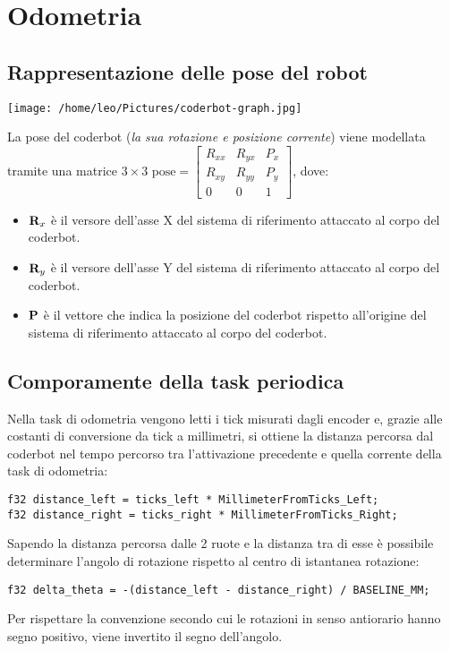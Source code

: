 \documentclass[11pt]{article}
\begin{document}
\section{Odometria}
\label{sec:orge318f63}
\subsection{Rappresentazione delle pose del robot}
\label{sec:orga4cc6c3}
\begin{center}
\texttt{[image: /home/leo/Pictures/coderbot-graph.jpg]}
\end{center}

La pose del coderbot (\emph{la sua rotazione e posizione corrente}) viene modellata tramite una matrice \(3\times3\)  \(\text{pose}=\begin{bmatrix}R_{xx}&R_{yx}&P_x\\R_{xy}&R_{yy}&P_y\\0&0&1\end{bmatrix}\), dove:
\begin{itemize}
\item \(\bold R_{x}\) è il versore dell'asse X del sistema di riferimento attaccato al corpo del coderbot.
\item \(\bold R_{y}\) è il versore dell'asse Y del sistema di riferimento attaccato al corpo del coderbot.
\item \(\bold P\) è il vettore che indica la posizione del coderbot rispetto all'origine del sistema di riferimento attaccato al corpo del coderbot.
\end{itemize}
\subsection{Comporamente della task periodica}
\label{sec:org69cb57c}
Nella task di odometria vengono letti i tick misurati dagli encoder e, grazie alle costanti di conversione da tick a millimetri, si ottiene la distanza percorsa dal coderbot nel tempo percorso tra l'attivazione precedente e quella corrente della task di odometria:
\begin{verbatim}
f32 distance_left = ticks_left * MillimeterFromTicks_Left;
f32 distance_right = ticks_right * MillimeterFromTicks_Right;
\end{verbatim}

Sapendo la distanza percorsa dalle 2 ruote e la distanza tra di esse è possibile determinare l'angolo di rotazione rispetto al centro di istantanea rotazione:
\begin{verbatim}
f32 delta_theta = -(distance_left - distance_right) / BASELINE_MM;
\end{verbatim}
Per rispettare la convenzione secondo cui le rotazioni in senso antiorario hanno segno positivo, viene invertito il segno dell'angolo.
\end{document}

